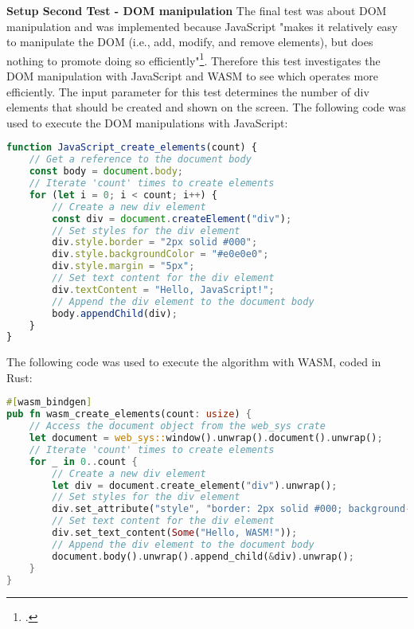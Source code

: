 \textbf{Setup Second Test - DOM manipulation} \newline
The final test was about DOM manipulation and was implemented because JavaScript "makes it relatively easy to manipulate the DOM (i.e., add, modify, and remove elements), but does nothing to promote doing so efficiently"\footcite{peterson_10_nodate}. Therefore this test investigates the DOM manipulation with JavaScript and WASM to see which operates more efficiently. The input parameter for this test determines the number of div elements that should be created and shown on the screen.
\newpage
The following code was used to execute the DOM manipulations with JavaScript:
\begin{lstlisting}[language=JavaScript, caption={DOM manipulation in JavaScript, source: self-coded}]
function JavaScript_create_elements(count) {
    // Get a reference to the document body
    const body = document.body;
    // Iterate 'count' times to create elements
    for (let i = 0; i < count; i++) {
        // Create a new div element
        const div = document.createElement("div");
        // Set styles for the div element
        div.style.border = "2px solid #000";
        div.style.backgroundColor = "#e0e0e0";
        div.style.margin = "5px";
        // Set text content for the div element
        div.textContent = "Hello, JavaScript!";
        // Append the div element to the document body
        body.appendChild(div);
    }
}
\end{lstlisting}

The following code was used to execute the algorithm with WASM, coded in Rust:
\begin{lstlisting}[language=Rust, caption={DOM manipulation in Rust, source: self-coded}]
#[wasm_bindgen]
pub fn wasm_create_elements(count: usize) {
    // Access the document object from the web_sys crate
    let document = web_sys::window().unwrap().document().unwrap();
    // Iterate 'count' times to create elements
    for _ in 0..count {
        // Create a new div element
        let div = document.create_element("div").unwrap();
        // Set styles for the div element
        div.set_attribute("style", "border: 2px solid #000; background-color: #e0e0e0; margin: 5px;").unwrap();
        // Set text content for the div element
        div.set_text_content(Some("Hello, WASM!"));
        // Append the div element to the document body
        document.body().unwrap().append_child(&div).unwrap();
    }
}
\end{lstlisting}

